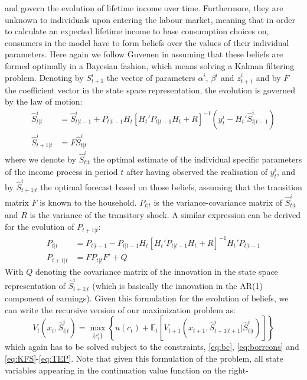 and govern the evolution of lifetime income over time. Furthermore, they are 
unknown to individuals upon entering the labour market, meaning that in order to
 calculate an expected lifetime income to base consumption choices on, consumers 
in the model have to form beliefs over the values of their individual parameters. 
Here again we follow Guvenen in assuming that these beliefs are formed optimally
in a Bayesian fashion, which means solving a Kalman filtering problem. 
Denoting by $S^i_{t+1}$ the vector of parameters $\alpha^i$, $\beta^i$ and 
$z^i_{t+1}$ and by $F$ the coefficient vector in the state space representation,
the evolution is governed by the law of motion:
\begin{align}
\hat{S}^i_{t|t} &= \hat{S}^i_{t|t-1} + P_{t|t-1} H_t [H_t' P_{t|t-1} H_t + R]^{-1}(y_t^i - H_t' \hat{S}^i_{t|t-1}) \label{eq:KFS} \\
\hat{S}^i_{t+1|t} &= F \hat{S}^i_{t|t} \label{eq:TES}
\end{align}
where we denote by $\hat{S}^i_{t|t}$ the optimal estimate of the individual specific
parameters of the income process in period $t$ after having observed the realisation
of $y_t^i$, and by $\hat{S}^i_{t+1|t}$ the optimal forecast based on those beliefs,
assuming that the transition matrix $F$ is known to the household. $P_{t|t}$ is 
the variance-covariance matrix of $\hat{S}^i_{t|t}$ and $R$  is the variance of 
the transitory shock. A similar expression can be derived for the evolution of 
$P_{t+1|t}$:
\begin{align}
P_{t|t} &= P_{t|t-1} - P_{t|t-1} H_t [ H_t' P_{t|t-1} H_t + R]^{-1} H_t' P_{t|t-1} \label{eq:KFP} \\
P_{t+1|t} &= F P_{t|t} F' + Q \label{eq:TEP}
\end{align}
With $Q$ denoting the covariance matrix of the innovation in the state space 
representation of $\hat{S}_{t+1|t}^i$ (which is basically the innovation in the 
AR(1) component of earnings). 
Given this formulation for the evolution of beliefs, we can write the recursive 
version of our maximization problem as:
\begin{equation} \label{eq:bellman}
V_t(x_t,\hat{S}^i_{t|t}) = \max_{\{c_t^i\}} \left\{ u(c_t) + \mathbb{E}_t \left[ V_{t+1}(x_{t+1},\hat{S}^i_{t+1|t+1}|\hat{S}^i_{t|t}) \right] \right\}
\end{equation}
which again has to be solved subject to the constraints, \ref{eq:bc}, \ref{eq:borrcons} 
and \ref{eq:KFS}-\ref{eq:TEP}. Note that given this formulation of the problem, 
all state variables appearing in the continuation value function on the right-
